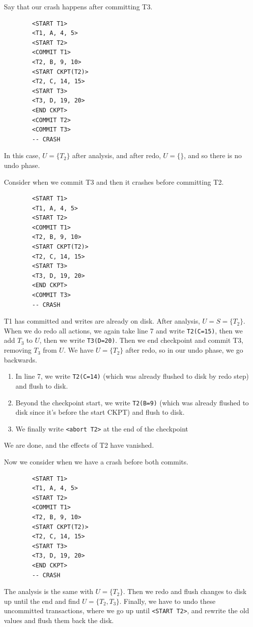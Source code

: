     \begin{example}
      Say that our crash happens after committing T3. 

      \begin{lstlisting}
        <START T1>
        <T1, A, 4, 5>
        <START T2>
        <COMMIT T1>
        <T2, B, 9, 10>
        <START CKPT(T2)>
        <T2, C, 14, 15>
        <START T3>
        <T3, D, 19, 20>
        <END CKPT>
        <COMMIT T2>
        <COMMIT T3>
        -- CRASH
      \end{lstlisting} 
      In this case, $U = \{T_2\}$ after analysis, and after redo, $U = \{\}$, and so there is no undo phase. 
    \end{example}

    \begin{example}
      Consider when we commit T3 and then it crashes before committing T2. 
      \begin{lstlisting}
        <START T1>
        <T1, A, 4, 5>
        <START T2>
        <COMMIT T1>
        <T2, B, 9, 10>
        <START CKPT(T2)>
        <T2, C, 14, 15>
        <START T3>
        <T3, D, 19, 20>
        <END CKPT>
        <COMMIT T3>
        -- CRASH
      \end{lstlisting} 
      T1 has committed and writes are already on disk. After analysis, $U = S = \{T_2\}$. When we do redo all actions, we again take line 7 and write \texttt{T2(C=15)}, then we add $T_3$ to $U$, then we write \texttt{T3(D=20)}. Then we end checkpoint and commit T3, removing $T_3$ from $U$. We have $U = \{T_2\}$ after redo, so in our undo phase, we go backwards. 
      \begin{enumerate}
        \item In line 7, we write \texttt{T2(C=14)} (which was already flushed to disk by redo step) and flush to disk.  
        \item Beyond the checkpoint start, we write \texttt{T2(B=9)} (which was already flushed to disk since it's before the start CKPT) and flush to disk. 
        \item We finally write \texttt{<abort T2>} at the end of the checkpoint
      \end{enumerate} 
      We are done, and the effects of T2 have vanished. 
    \end{example}

    \begin{example}
      Now we consider when we have a crash before both commits. 
      \begin{lstlisting}
        <START T1>
        <T1, A, 4, 5>
        <START T2>
        <COMMIT T1>
        <T2, B, 9, 10>
        <START CKPT(T2)>
        <T2, C, 14, 15>
        <START T3>
        <T3, D, 19, 20>
        <END CKPT>
        -- CRASH
      \end{lstlisting} 
      The analysis is the same with $U = \{T_2\}$. Then we redo and flush changes to disk up until the end and find $U = \{T_2, T_3\}$. Finally, we have to undo these uncommitted transactions, where we go up until \texttt{<START T2>}, and rewrite the old values and flush them back the disk. 
    \end{example}

